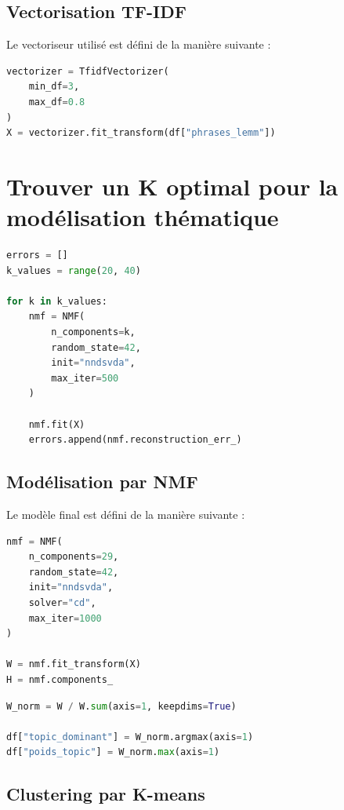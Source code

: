 \subsection{Vectorisation TF-IDF}
Le vectoriseur utilisé est défini de la manière suivante :

\begin{lstlisting}[language=Python, caption={Création de la matrice terme-document avec TF-IDF}]
vectorizer = TfidfVectorizer(
    min_df=3,
    max_df=0.8
)
X = vectorizer.fit_transform(df["phrases_lemm"])
\end{lstlisting}

\section{Trouver un K optimal pour la modélisation thématique}

\begin{lstlisting}[language=Python, caption={Recherche du nombre de topics par la méthode du coude}]
errors = []
k_values = range(20, 40)

for k in k_values:
    nmf = NMF(
        n_components=k,
        random_state=42,
        init="nndsvda",
        max_iter=500
    )

    nmf.fit(X)
    errors.append(nmf.reconstruction_err_)
\end{lstlisting}

\subsection{Modélisation par NMF}

Le modèle final est défini de la manière suivante :

\begin{lstlisting}[language=Python, caption={Entraînement du modèle NMF final}]
nmf = NMF(
    n_components=29,
    random_state=42,
    init="nndsvda",
    solver="cd",
    max_iter=1000
)

W = nmf.fit_transform(X)
H = nmf.components_
\end{lstlisting}


\begin{lstlisting}[language=Python, caption={Attribution du topic dominant à chaque segment}]
W_norm = W / W.sum(axis=1, keepdims=True)

df["topic_dominant"] = W_norm.argmax(axis=1)
df["poids_topic"] = W_norm.max(axis=1)
\end{lstlisting}

\subsection{Clustering par K-means}

